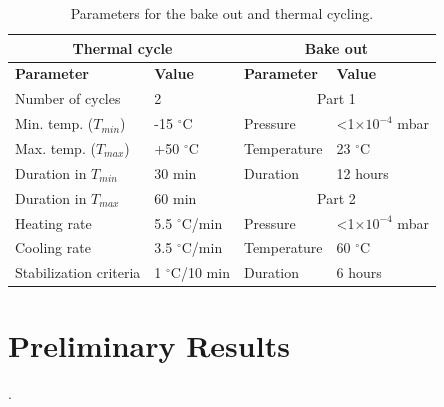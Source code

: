\begin{table}[!h]
    \begin{center}
        \begin{tabular}{llll}
            \toprule[1.5pt]
            \multicolumn{2}{c}{\textbf{Thermal cycle}}  & \multicolumn{2}{c}{\textbf{Bake out}}        \\
            \midrule
            \textbf{Parameter}     & \textbf{Value}     & \textbf{Parameter} & \textbf{Value}          \\
            \midrule
            Number of cycles       & 2                  & \multicolumn{2}{c}{Part 1}                   \\
            \cmidrule{3-4}
            Min. temp. ($T_{min}$) & -15 $^\circ$C      & Pressure           & <1$\times 10^{-4}$ mbar \\
            Max. temp. ($T_{max}$) & +50 $^\circ$C      & Temperature        & 23 $^\circ$C            \\
            Duration in $T_{min}$  & 30 min             & Duration           & 12 hours                \\
            \cmidrule{3-4}
            Duration in $T_{max}$  & 60 min             & \multicolumn{2}{c}{Part 2}                   \\
            \cmidrule{3-4}
            Heating rate           & 5.5 $^\circ$C/min  & Pressure           & <1$\times 10^{-4}$ mbar \\
            Cooling rate           & 3.5 $^\circ$C/min  & Temperature        & 60 $^\circ$C            \\
            Stabilization criteria & 1 $^\circ$C/10 min & Duration           & 6 hours                 \\
            \bottomrule[1.5pt]
        \end{tabular}
        \caption{Parameters for the bake out and thermal cycling.}
        \label{tab:fsat-thermal-cycling}
    \end{center}
\end{table}

\section{Preliminary Results}

.
